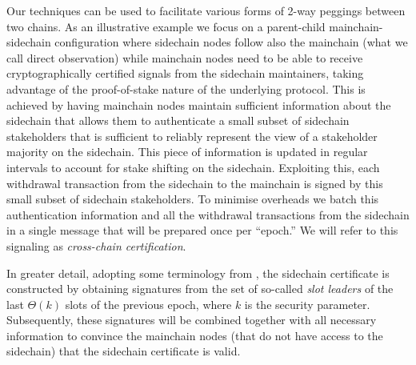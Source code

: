 Our techniques can be used to facilitate various forms of 2-way peggings
between two chains. As an illustrative example we focus on a parent-child
mainchain-sidechain
configuration where sidechain nodes follow also the mainchain (what we call direct observation) while mainchain nodes need to be able to receive cryptographically
certified signals
from the sidechain maintainers,
taking advantage of the proof-of-stake nature of the underlying protocol. This is achieved by having
mainchain nodes maintain sufficient information about the sidechain that allows
them to authenticate a
small subset of  sidechain stakeholders that is sufficient to
reliably represent the view of a stakeholder majority on the sidechain.
This piece of information is updated in regular intervals to account
for  stake shifting on the sidechain.
Exploiting this, each withdrawal  transaction from the sidechain to the mainchain
is signed by this  small subset of sidechain stakeholders.
To minimise overheads we batch this authentication information and all the withdrawal transactions from
the sidechain in a single message that will be prepared once per ``epoch.'' We will
refer to this signaling  as
 {\em cross-chain certification}.

In greater detail, adopting some terminology  from \cite{ouroboros},
the sidechain certificate  is constructed by obtaining
signatures  from the set of so-called \emph{slot leaders} of the last
$\Theta(k)$ slots of the previous epoch, where $k$ is the security parameter.
Subsequently, these signatures will be combined together with all necessary
information to convince the mainchain nodes (that do not have access to the
sidechain) that the sidechain certificate is valid.

